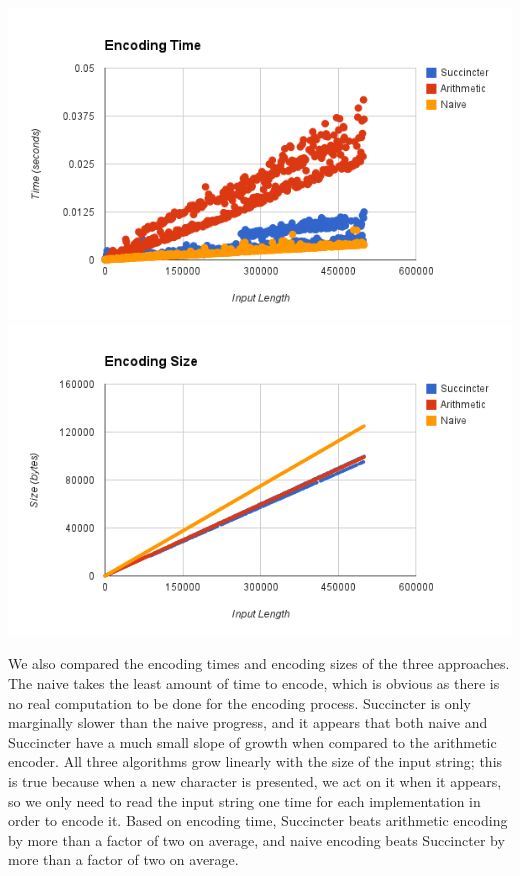 \documentclass{article}
\begin{document}
\includegraphics[scale=0.4]{images/encoding_time}
\includegraphics[scale=0.4]{images/encoding_size}
\afterpage{\vfill}

We also compared the encoding times and encoding sizes of the three approaches. The naive takes the least amount of time to encode, which is obvious as there is no real computation to be done for the encoding process. Succincter is only marginally slower than the naive progress, and it appears that both naive and Succincter have a much small slope of growth when compared to the arithmetic encoder. All three algorithms grow linearly with the size of the input string; this is true because when a new character is presented, we act on it when it appears, so we only need to read the input string one time for each implementation in order to encode it. Based on encoding time, Succincter beats arithmetic encoding by more than a factor of two on average, and naive encoding beats Succincter by more than a factor of two on average.\\
\end{document}
